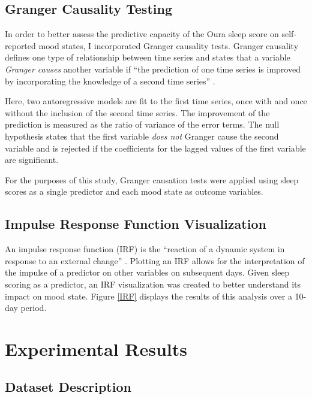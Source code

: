 \documentclass{article}
\begin{document}
\hypertarget{granger-causality}{%
\subsection{Granger Causality Testing}\label{granger-causality}}

In order to better assess the predictive capacity of the Oura sleep score on
self-reported mood states, I incorporated Granger causality tests. Granger
causality defines one type of relationship between time series
\citep{grangerInvestigating1969} and states that a variable \textit{Granger
causes} another variable if ``the prediction of one time series is improved by
incorporating the knowledge of a second time series'' \citep{boseVector2017}.

Here, two autoregressive models are fit to the first time series, once with and once
without the inclusion of the second time series. The improvement of the
prediction is measured as the ratio of variance of the error terms. The null
hypothesis states that the first variable \textit{does not} Granger cause the
second variable and is rejected if the coefficients for the lagged values of the
first variable are significant.

For the purposes of this study, Granger causation tests were applied using sleep
scores as a single predictor and each mood state as outcome variables.

\hypertarget{impulse-response-analysis}{%
\subsection{Impulse Response Function Visualization}\label{impulse-response-analysis}}

An impulse response function (IRF) is the ``reaction of a dynamic system in
response to an external change'' \citep{devriesWearableMeasured2023}. Plotting an
IRF allows for the interpretation of the impulse of a predictor on other
variables on subsequent days. Given sleep scoring as a predictor, an IRF
visualization was created to better understand its impact on mood state. Figure
\ref{IRF} displays the results of this analysis over a 10-day period.

\hypertarget{results}{%
\section{Experimental Results}\label{results}}

\hypertarget{dataset-description}{%
\subsection{Dataset Description}\label{dataset-description}}
\end{document}
